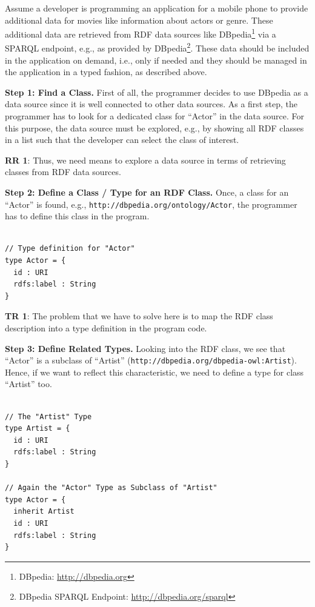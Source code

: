 \documentclass{llncs} %
\newcommand{\rr}[1]{\textbf{RR #1}}
\newcommand{\tr}[1]{\textbf{TR #1}}
\begin{document}
Assume a developer is programming an application for a mobile phone to provide additional
data for movies like information about actors or genre. These additional data
are retrieved from RDF data sources like DBpedia\footnote{DBpedia: \url{http://dbpedia.org}} via a SPARQL endpoint,
e.g., as provided by DBpedia\footnote{DBpedia SPARQL Endpoint: \url{http://dbpedia.org/sparql}}.
These data should be included in the application on demand, i.e., only if needed
and they should be managed in the application in a typed fashion,
as described above.

\vspace{0.8em}
\noindent
\textbf{Step 1: Find a Class.}
First of all, the programmer decides to use DBpedia as a data source since it is well connected to other
data sources. As a first step, the programmer has to look for a dedicated class for ``Actor'' in the data source.
For this purpose, the data source must be explored, e.g., by showing all RDF classes in a list
such that the developer can select the class of interest.

\rr{1}: Thus, we need means to explore a data source in terms of retrieving classes from RDF data sources.

\vspace{0.8em}
\noindent
\textbf{Step 2: Define a Class / Type for  an RDF Class.}
Once, a class for an ``Actor'' is found, e.g., \texttt{http://dbpedia.org/ontology/Actor}, the programmer has
to define this class in the program.

\begin{lstlisting}[style=code, caption={Type Definition for RDF Class ``Movie''}, label={lst:movietype}]

// Type definition for "Actor" 
type Actor = {
  id : URI
  rdfs:label : String 
}
\end{lstlisting}

\tr{1}: The problem that we have to solve here is to map the RDF class description into a type definition in the program code.

\vspace{0.8em}
\noindent
\textbf{Step 3: Define Related Types.}
Looking into the RDF class, we see that ``Actor'' is a subclass of ``Artist'' (\texttt{http://dbpedia.org/dbpedia-owl:Artist}).
Hence, if we want to reflect this characteristic, we need to define a type for class ``Artist'' too.

\begin{lstlisting}[style=code, caption={Type Definition for RDF Classes ``Actor'' and ``Artist''}, label={lst:worktype}]

// The "Artist" Type
type Artist = {
  id : URI
  rdfs:label : String
}

// Again the "Actor" Type as Subclass of "Artist"
type Actor = {
  inherit Artist
  id : URI
  rdfs:label : String
}
\end{lstlisting}
\end{document}
